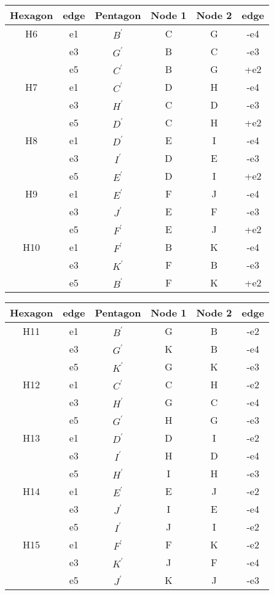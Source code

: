 \documentclass[12pt]{article}
\begin{document}
\begin{center}
\begin{tabular}{| c | c | c | c | c | c |}
\hline
Hexagon  & edge & Pentagon & Node 1 & Node 2 & edge \\
\hline
H6 &  e1  & $B^\prime$ &  C  & G &  -e4 \\
   &  e3  & $G^\prime$ &  B  & C &  -e3 \\
   &  e5  & $C^\prime$ &  B  & G &  +e2 \\
\hline
H7 &  e1  & $C^\prime$ &  D  & H &  -e4 \\
   &  e3  & $H^\prime$ &  C  & D &  -e3 \\
   &  e5  & $D^\prime$ &  C  & H &  +e2 \\
\hline
H8 &  e1  & $D^\prime$ &  E  & I &  -e4 \\
   &  e3  & $I^\prime$ &  D  & E &  -e3 \\
   &  e5  & $E^\prime$ &  D  & I &  +e2 \\
\hline
H9 &  e1  & $E^\prime$ &  F  & J &  -e4 \\
   &  e3  & $J^\prime$ &  E  & F &  -e3 \\
   &  e5  & $F^\prime$ &  E  & J &  +e2 \\
\hline
H10 &  e1  & $F^\prime$ &  B  & K &  -e4 \\
   &  e3  & $K^\prime$ &  F  & B &  -e3 \\
   &  e5  & $B^\prime$ &  F  & K &  +e2 \\
\hline
\end{tabular}
\end{center}

\begin{center}
\begin{tabular}{| c | c | c | c | c | c |}
\hline
Hexagon  & edge & Pentagon & Node 1 & Node 2 & edge \\
\hline
H11 &  e1  & $B^\prime$ &  G  & B &  -e2 \\
   &  e3  & $G^\prime$ &  K  & B &  -e4 \\
   &  e5  & $K^\prime$ &  G  & K &  -e3 \\
\hline
H12 &  e1  & $C^\prime$ &  C  & H &  -e2 \\
   &  e3  & $H^\prime$ &  G  & C &  -e4 \\
   &  e5  & $G^\prime$ &  H  & G &  -e3 \\
\hline
H13 &  e1  & $D^\prime$ &  D  & I &  -e2 \\
   &  e3  & $I^\prime$ &  H  & D &  -e4 \\
   &  e5  & $H^\prime$ &  I  & H &  -e3 \\
\hline
H14 &  e1  & $E^\prime$ &  E  & J &  -e2 \\
   &  e3  & $J^\prime$ &  I  & E &  -e4 \\
   &  e5  & $I^\prime$ &  J  & I &  -e2 \\
\hline
H15 &  e1  & $F^\prime$ &  F  & K &  -e2 \\
   &  e3  & $K^\prime$ &  J  & F &  -e4 \\
   &  e5  & $J^\prime$ &  K  & J &  -e3 \\
\hline
\end{tabular}
\end{center}
\end{document}
